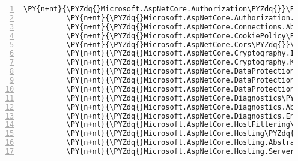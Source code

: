 \begin{Verbatim}[commandchars=\\\{\},numbers=left,firstnumber=1,stepnumber=1,numberblanklines=0]
          \PY{n+nt}{\PYZdq{}Microsoft.AspNetCore.Authorization\PYZdq{}}\PY{p}{:} \PY{l+s+s2}{\PYZdq{}2.1.0\PYZhy{}rc1\PYZhy{}final\PYZdq{}}\PY{p}{,}
          \PY{n+nt}{\PYZdq{}Microsoft.AspNetCore.Authorization.Policy\PYZdq{}}\PY{p}{:} \PY{l+s+s2}{\PYZdq{}2.1.0\PYZhy{}rc1\PYZhy{}final\PYZdq{}}\PY{p}{,}
          \PY{n+nt}{\PYZdq{}Microsoft.AspNetCore.Connections.Abstractions\PYZdq{}}\PY{p}{:} \PY{l+s+s2}{\PYZdq{}2.1.0\PYZhy{}rc1\PYZhy{}final\PYZdq{}}\PY{p}{,}
          \PY{n+nt}{\PYZdq{}Microsoft.AspNetCore.CookiePolicy\PYZdq{}}\PY{p}{:} \PY{l+s+s2}{\PYZdq{}2.1.0\PYZhy{}rc1\PYZhy{}final\PYZdq{}}\PY{p}{,}
          \PY{n+nt}{\PYZdq{}Microsoft.AspNetCore.Cors\PYZdq{}}\PY{p}{:} \PY{l+s+s2}{\PYZdq{}2.1.0\PYZhy{}rc1\PYZhy{}final\PYZdq{}}\PY{p}{,}
          \PY{n+nt}{\PYZdq{}Microsoft.AspNetCore.Cryptography.Internal\PYZdq{}}\PY{p}{:} \PY{l+s+s2}{\PYZdq{}2.1.0\PYZhy{}rc1\PYZhy{}final\PYZdq{}}\PY{p}{,}
          \PY{n+nt}{\PYZdq{}Microsoft.AspNetCore.Cryptography.KeyDerivation\PYZdq{}}\PY{p}{:} \PY{l+s+s2}{\PYZdq{}2.1.0\PYZhy{}rc1\PYZhy{}final\PYZdq{}}\PY{p}{,}
          \PY{n+nt}{\PYZdq{}Microsoft.AspNetCore.DataProtection\PYZdq{}}\PY{p}{:} \PY{l+s+s2}{\PYZdq{}2.1.0\PYZhy{}rc1\PYZhy{}final\PYZdq{}}\PY{p}{,}
          \PY{n+nt}{\PYZdq{}Microsoft.AspNetCore.DataProtection.Abstractions\PYZdq{}}\PY{p}{:} \PY{l+s+s2}{\PYZdq{}2.1.0\PYZhy{}rc1\PYZhy{}final\PYZdq{}}\PY{p}{,}
          \PY{n+nt}{\PYZdq{}Microsoft.AspNetCore.DataProtection.Extensions\PYZdq{}}\PY{p}{:} \PY{l+s+s2}{\PYZdq{}2.1.0\PYZhy{}rc1\PYZhy{}final\PYZdq{}}\PY{p}{,}
          \PY{n+nt}{\PYZdq{}Microsoft.AspNetCore.Diagnostics\PYZdq{}}\PY{p}{:} \PY{l+s+s2}{\PYZdq{}2.1.0\PYZhy{}rc1\PYZhy{}final\PYZdq{}}\PY{p}{,}
          \PY{n+nt}{\PYZdq{}Microsoft.AspNetCore.Diagnostics.Abstractions\PYZdq{}}\PY{p}{:} \PY{l+s+s2}{\PYZdq{}2.1.0\PYZhy{}rc1\PYZhy{}final\PYZdq{}}\PY{p}{,}
          \PY{n+nt}{\PYZdq{}Microsoft.AspNetCore.Diagnostics.EntityFrameworkCore\PYZdq{}}\PY{p}{:} \PY{l+s+s2}{\PYZdq{}2.1.0\PYZhy{}rc1\PYZhy{}final\PYZdq{}}\PY{p}{,}
          \PY{n+nt}{\PYZdq{}Microsoft.AspNetCore.HostFiltering\PYZdq{}}\PY{p}{:} \PY{l+s+s2}{\PYZdq{}2.1.0\PYZhy{}rc1\PYZhy{}final\PYZdq{}}\PY{p}{,}
          \PY{n+nt}{\PYZdq{}Microsoft.AspNetCore.Hosting\PYZdq{}}\PY{p}{:} \PY{l+s+s2}{\PYZdq{}2.1.0\PYZhy{}rc1\PYZhy{}final\PYZdq{}}\PY{p}{,}
          \PY{n+nt}{\PYZdq{}Microsoft.AspNetCore.Hosting.Abstractions\PYZdq{}}\PY{p}{:} \PY{l+s+s2}{\PYZdq{}2.1.0\PYZhy{}rc1\PYZhy{}final\PYZdq{}}\PY{p}{,}
          \PY{n+nt}{\PYZdq{}Microsoft.AspNetCore.Hosting.Server.Abstractions\PYZdq{}}\PY{p}{:} \PY{l+s+s2}{\PYZdq{}2.1.0\PYZhy{}rc1\PYZhy{}final\PYZdq{}}\PY{p}{,}

\end{Verbatim}
